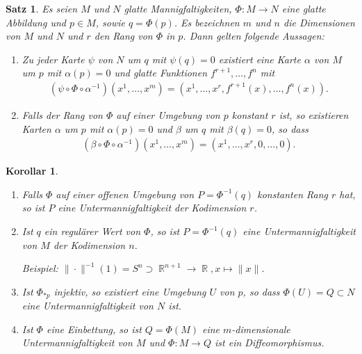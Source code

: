 \documentclass[paper=A4, twoside, chapterprefix=true, bibliography=totoc, headsepline]{scrbook}
\DeclareMathOperator{\R}{\mathbb{R}}
\theoremstyle{plain}
\newtheorem{Satz}[Dfn]{Satz}
\newtheorem{Kor}[Dfn]{Korollar}
\theoremstyle{nonumberplain}
\theoremstyle{empty}
\theoremstyle{break}
\begin{document}
\begin{Satz}\label{satz-3-4}
  Es seien $M$ und $N$ glatte Mannigfaltigkeiten, $\Phi \colon M \to N$ eine glatte Abbildung und $p \in M$, sowie $q = \Phi(p)$. Es bezeichnen $m$ und $n$ die Dimensionen von $M$ und $N$ und $r$ den Rang von $\Phi$ in $p$. Dann gelten folgende Aussagen:
  \begin{enumerate}[label=(\roman*),leftmargin=*,widest=ii]
  \item Zu jeder Karte $\psi$ von $N$ um $q$ mit $\psi(q) = 0$ existiert eine Karte $\alpha$ von $M$ um $p$ mit $\alpha(p) = 0$ und glatte Funktionen $f^{r+1},\ldots,f^n$ mit
    \begin{align*}
      \left(\psi \circ \Phi \circ \alpha^{-1}\right)\left(x^1,\ldots, x^m\right) = \left(x^1, \ldots, x^{r}, f^{r+1}(x), \ldots, f^n(x)\right).
    \end{align*}
  \item Falls der Rang von $\Phi$ auf einer Umgebung von $p$ konstant $r$ ist, so existieren Karten $\alpha$ um $p$ mit $\alpha(p) = 0$ und $\beta$ um $q$ mit $\beta(q) = 0$, so dass
    \begin{align*}
      \left(\beta \circ \Phi \circ \alpha^{-1}\right)\left(x^1, \ldots, x^m\right) = \left(x^1, \ldots, x^r, 0, \ldots, 0\right).
    \end{align*}
  \end{enumerate}
\end{Satz} 

\begin{Kor}
  \begin{enumerate}[label=(\roman*),widest=iii,leftmargin=*]
  \item Falls $\Phi$ auf einer offenen Umgebung von $P = \Phi^{-1}(q)$ konstanten Rang $r$ hat, so ist $P$ eine Untermannigfaltigkeit der Kodimension $r$.
  \item Ist $q$ ein regul\"arer Wert von $\Phi$, so ist $P = \Phi^{-1}(q)$ eine Untermannigfaltigkeit von $M$ der Kodimension $n$.
  
    Beispiel: $\|\cdot\|^{-1}(1) = S^n \supset \R^{n+1} \to \R, x \mapsto \|x\|$.
  \item Ist $\Phi_{*p}$ injektiv, so existiert eine Umgebung $U$ von $p$, so dass $\Phi(U) = Q \subset N$ eine Untermannigfaltigkeit von $N$ ist.
  \item Ist $\Phi$ eine Einbettung, so ist $Q = \Phi(M)$ eine $m$-dimensionale Untermannigfaltigkeit von $M$ und $\Phi \colon M \to Q$ ist ein Diffeomorphismus.
  \end{enumerate}
\end{Kor}
\end{document}
